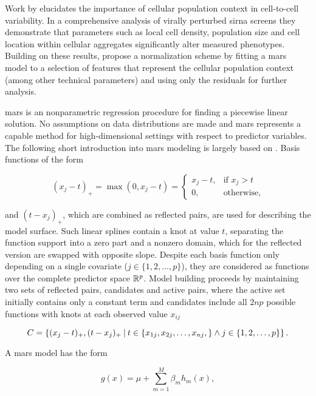Work by \citeauthor{Snijder2012} elucidates the importance of cellular population context in cell-to-cell variability. In a comprehensive analysis of virally perturbed \gls{sirna} screens they demonstrate that parameters such as local cell density, population size and cell location within cellular aggregates significantly alter measured phenotypes. Building on these results, \citeauthor{Knapp2011} propose a normalization scheme by fitting a \gls{mars} model to a selection of features that represent the cellular population context (among other technical parameters) and using only the residuals for further analysis.

\Gls{mars} is an nonparametric regression procedure for finding a piecewise linear solution. No assumptions on data distributions are made and \gls{mars} represents a capable method for high-dimensional settings with respect to predictor variables. The following short introduction into \gls{mars} modeling is largely based on \cite{Hastie2009}. Basis functions of the form

\begin{equation}
  (x_j-t)_+ = \max(0, x_j-t) =
  \begin{cases}
    x_j-t,& \text{if } x_j > t\\
    0,              & \text{otherwise},
  \end{cases}
\end{equation}

and $(t-x_j)_+$, which are combined as reflected pairs, are used for describing the model surface. Such linear splines contain a knot at value $t$, separating the function support into a zero part and a nonzero domain, which for the reflected version are swapped with opposite slope. Despite each basis function only depending on a single covariate ($j \in \{1, 2, \dotsc, p\}$), they are considered as functions over the complete predictor space $\mathbb{R}^p$. Model building proceeds by maintaining two sets of reflected pairs, candidates and active pairs, where the active set initially contains only a constant term and candidates include all $2np$ possible functions with knots at each observed value $x_{ij}$

\begin{equation}
  C = \left\{(x_j-t)_+, (t-x_j)_+ \:\vert\: t\in\{x_{1j}, x_{2j}, \dotsc, x_{nj}, \} \land j\in\{1, 2, \dotsc, p\} \right\}.
\end{equation}

A \gls{mars} model has the form

\begin{equation}
  g(x) = \mu + \sum_{m=1}^M \beta_m h_m(x),
\end{equation}

